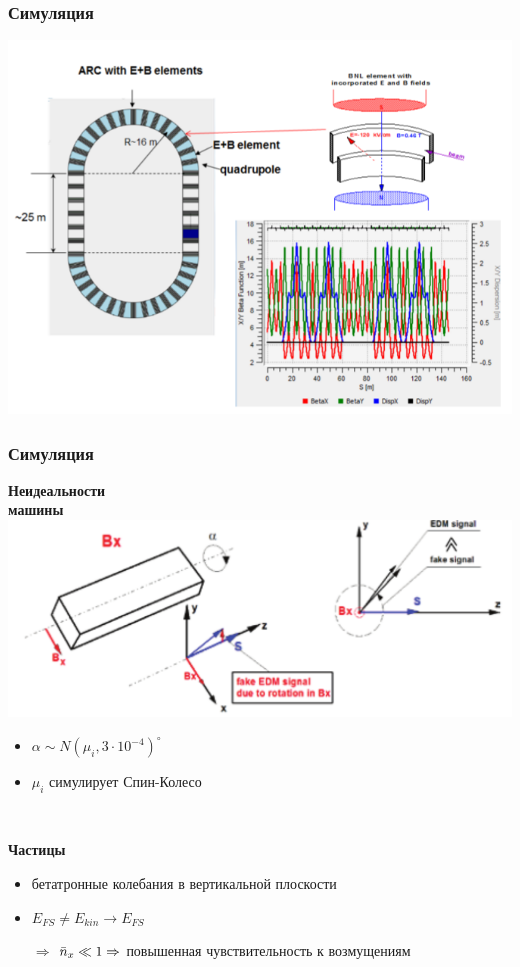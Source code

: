 \documentclass[14pt]{beamer}
\begin{document}
\begin{frame}\frametitle{Симуляция}
	\includegraphics[width=\linewidth]{chapter2/BNL_lattice}
\end{frame}
\begin{frame}\frametitle{Симуляция}
	\begin{minipage}[t]{.48\linewidth}
		\textbf{Неидеальности\\ машины}
		\includegraphics[width=1.2\linewidth, trim=80 10 0 0, clip]{images/magnet_tilting}
		\begin{itemize}
			\item $\alpha\sim N(\mu_i, 3\cdot10^{-4})^\circ$
			\item $\mu_i$ симулирует Спин-Колесо 
		\end{itemize}
	\end{minipage}~~~~
	\begin{minipage}[t]{.45\linewidth}
		\textbf{Частицы}
		\begin{itemize}
			\item бетатронные колебания в вертикальной плоскости
			\item $E_{FS}\neq E_{kin}\to E_{FS}$
			\item[$\Rightarrow$] $\bar n_x\ll 1 \Rightarrow$ повышенная чувствительность к возмущениям
		\end{itemize}
	\end{minipage}
\end{frame}
\end{document}
